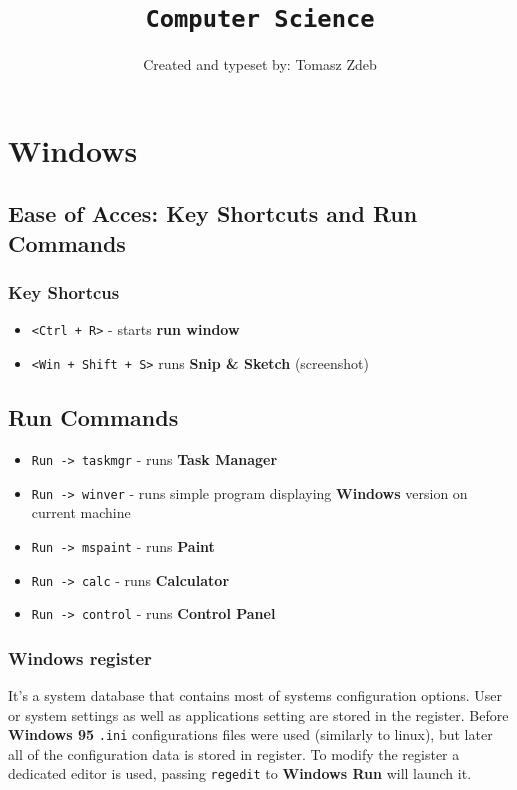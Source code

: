 \documentclass[11pt,a4paper]{article}
\date{\vspace{-3em}}
\title{\vspace{-2em}\texttt{Computer Science}\vspace{-0.5em}}
\author{Created and typeset by: Tomasz Zdeb}
\newcommand{\myline}[2]{\noindent\makebox[\linewidth]{\rule{#1cm}{#2pt}}}
\newcommand{\keyshortcut}[1]{\texttt{#1}}
\begin{document}
\maketitle
\myline{16}{1}

\tableofcontents
\newpage

\section{Windows}

\subsection{Ease of Acces: Key Shortcuts and Run Commands}

\subsubsection{Key Shortcus}
\begin{itemize}
\item \keyshortcut{<Ctrl + R>} - starts \textbf{run window}
\item \keyshortcut{<Win + Shift + S>} runs \textbf{Snip \& Sketch} (screenshot)
\end{itemize}

\subsection{Run Commands}
\begin{itemize}
\item \keyshortcut{Run -> taskmgr} - runs \textbf{Task Manager}
\item \keyshortcut{Run -> winver} - runs simple program displaying \textbf{Windows} version on current machine
\item \keyshortcut{Run -> mspaint} - runs \textbf{Paint}
\item \keyshortcut{Run -> calc} - runs \textbf{Calculator}
\item \keyshortcut{Run -> control} - runs \textbf{Control Panel}
\end{itemize}

\subsubsection{Windows register}
It's a system database that contains most of systems configuration options. User or system settings as well as applications setting are stored in the register. Before \textbf{Windows 95} \texttt{.ini} configurations files were used (similarly to linux), but later all of the configuration data is stored in register. To modify the register a dedicated editor is used, passing \texttt{regedit} to \textbf{Windows Run} will launch it.\\
\end{document}
